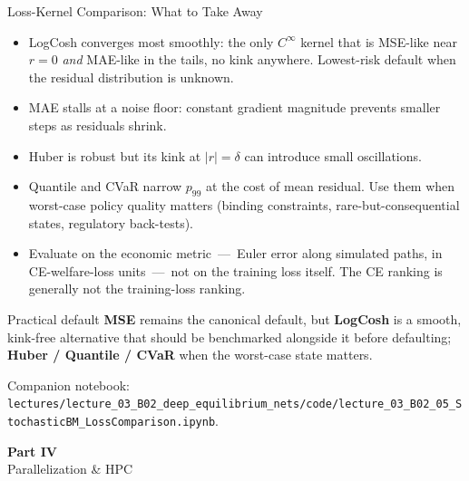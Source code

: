 \documentclass[aspectratio=169,11pt]{beamer}
\newcommand{\emphc}[1]{\textcolor{harvardcrimson}{#1}}
\begin{document}
\begin{frame}{Loss-Kernel Comparison: What to Take Away}
\scriptsize
\begin{itemize}\itemsep1.5pt
    \item \emphc{LogCosh converges most smoothly:} the only $C^\infty$ kernel that is MSE-like near $r=0$ \emph{and} MAE-like in the tails, no kink anywhere.  Lowest-risk default when the residual distribution is unknown.
    \item \emphc{MAE stalls} at a noise floor: constant gradient magnitude prevents smaller steps as residuals shrink.
    \item \emphc{Huber is robust} but its kink at $|r|{=}\delta$ can introduce small oscillations.
    \item \emphc{Quantile and CVaR} narrow $p_{99}$ at the cost of mean residual.  Use them when worst-case policy quality matters (binding constraints, rare-but-consequential states, regulatory back-tests).
    \item \emphc{Evaluate on the economic metric}~---~Euler error along simulated paths, in CE-welfare-loss units~---~not on the training loss itself.  The CE ranking is generally not the training-loss ranking.
\end{itemize}

\vspace{0.4em}
\begin{exampleblock}{Practical default}
\textbf{MSE} remains the canonical default, but \textbf{LogCosh} is a smooth, kink-free alternative that should be benchmarked alongside it before defaulting; \textbf{Huber / Quantile / CVaR} when the worst-case state matters.
\end{exampleblock}

\vspace{0.2em}
{\scriptsize Companion notebook: \texttt{lectures/lecture\_03\_B02\_deep\_equilibrium\_nets/code/lecture\_03\_B02\_05\_StochasticBM\_LossComparison.ipynb}.}
\end{frame}


\begin{frame}{}
\vfill
\begin{center}
{\Huge \textcolor{uzhblue}{\textbf{Part IV}}}\\[12pt]
{\LARGE Parallelization \& HPC}
\end{center}
\vfill
\end{frame}
\end{document}
